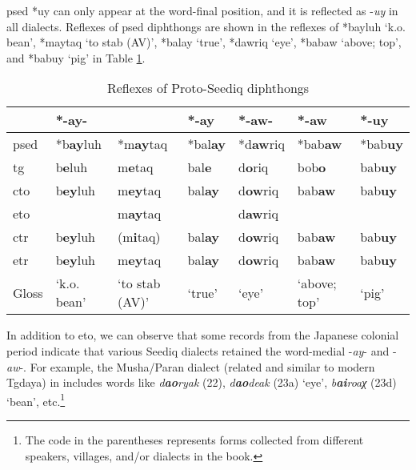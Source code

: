 \acl{psed} *uy can only appear at the word-final position, and it is reflected as -\textit{uy} in all dialects. Reflexes of \acl{psed} diphthongs are shown in the reflexes of *bayluh `k.o. bean', *maytaq `to stab (AV)', *balay `true', *dawriq `eye', *babaw `above; top', and *babuy `pig' in Table \ref{tab:psed_VV}.

\begin{table}[!htbp]
\centering
\caption{Reflexes of Proto-Seediq diphthongs}
\label{tab:psed_VV}
\begin{tabular}{lllllll}\hline
           & \multicolumn{2}{l}{*-ay-}       & *-ay   & *-aw-   & *-aw         & *-uy   \\ \hline
\acs{psed} & *b\textbf{ay}luh  & *m\textbf{ay}taq   & *bal\textbf{ay} & *d\textbf{aw}riq & *bab\textbf{aw}       & *bab\textbf{uy} \\ \hdashline
\acs{tg}   & b\textbf{e}luh    & m\textbf{e}taq     & bal\textbf{e}   & d\textbf{o}riq   & bob\textbf{o}         & bab\textbf{uy}  \\
\acs{cto}  & b\textbf{ey}luh   & m\textbf{ey}taq    & bal\textbf{ay}  & d\textbf{ow}riq  & bab\textbf{aw}        & bab\textbf{uy}  \\
\acs{eto}  &                   & m\textbf{ay}taq    &                 & d\textbf{aw}riq  &              &        \\
\acs{ctr}  & b\textbf{ey}luh   & (m\textbf{i}taq)   & bal\textbf{ay}  & d\textbf{ow}riq  & bab\textbf{aw}        & bab\textbf{uy}  \\
\acs{etr}  & b\textbf{ey}luh   & m\textbf{ey}taq    & bal\textbf{ay}  & d\textbf{ow}riq  & bab\textbf{aw}        & bab\textbf{uy}  \\ \hline
Gloss      & `k.o. bean'       & `to stab (AV)'     & `true' & `eye'   & `above; top' & `pig' 
\\ \hline
\end{tabular}
\end{table}

In addition to \acl{eto}, we can observe that some records from the Japanese colonial period indicate that various Seediq dialects retained the word-medial -\textit{ay}- and -\textit{aw}-. For example, the Musha/Paran dialect (related and similar to modern Tgdaya) in \textcite{ogawa2006voc} includes words like \textit{d\textbf{ao}ryak} (22), \textit{d\textbf{ao}deak} (23a) `eye', \textit{b\textbf{ai}roaχ} (23d) `bean', etc.\footnote{The code in the parentheses represents forms collected from different speakers, villages, and/or dialects in the book.} 

